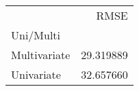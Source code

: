 \begin{tabular}{lr}
 & RMSE \\
Uni/Multi &  \\
Multivariate & 29.319889 \\
Univariate & 32.657660 \\
\end{tabular}

